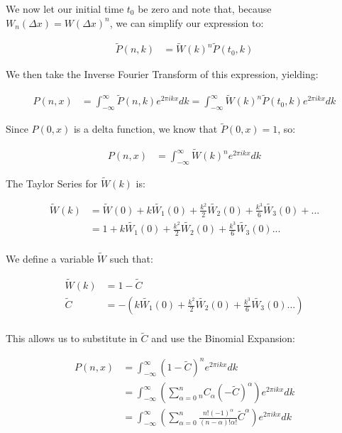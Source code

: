 \documentclass[10pt]{article} %
\begin{document}
We now let our initial time $t_0$ be zero and note that, because
$W_n(\Delta x) = W(\Delta x)^n$, we can simplify our expression to:

\begin{align}
  \widetilde{P}(n,k) &= \widetilde{W}(k)^n\widetilde{P}(t_0,k)
\end{align}

We then take the Inverse Fourier Transform of this expression, yielding:

\begin{align}
  P(n,x) &= \int_{-\infty}^{\infty}\widetilde{P}(n,k)e^{2\pi ikx}dk
  = \int_{-\infty}^{\infty}\widetilde{W}(k)^n\widetilde{P}(t_0,k)e^{2\pi ikx}dk
\end{align}

Since $P(0,x)$ is a delta function, we know that $\widetilde{P}(0,x) = 1$, so:

\begin{align}
  P(n,x) &=  \int_{-\infty}^{\infty}\widetilde{W}(k)^ne^{2\pi ikx}dk
\end{align}

The Taylor Series for $\widetilde{W}(k)$ is:

\begin{align*}
  \widetilde{W}(k) &= \widetilde{W}(0) + k\widetilde{W_1}(0) + \frac{k^2}{2}\widetilde{W_2}(0) + \frac{k^3}{6}\widetilde{W_3}(0) + ...\\
  &= 1 + k\widetilde{W_1}(0) + \frac{k^2}{2}\widetilde{W_2}(0) + \frac{k^3}{6}\widetilde{W_3}(0) ...\\
\end{align*}

We define a variable $\widetilde{W}$ such that:

\begin{align*}
  \widetilde{W}(k) &= 1 - \widetilde{C}\\
  \widetilde{C} &= -(k\widetilde{W_1}(0) + \frac{k^2}{2}\widetilde{W_2}(0) + \frac{k^3}{6}\widetilde{W_3}(0) ...)\\
\end{align*}

This allows us to substitute in $\widetilde{C}$ and use the Binomial Expansion:

\begin{align}
  P(n,x) &=  \int_{-\infty}^{\infty}\left(1 - \widetilde{C}\right)^ne^{2\pi ikx}dk\\
  &= \int_{-\infty}^{\infty}\left(\sum_{\alpha=0}^n {}_nC_\alpha\left(-\widetilde{C}\right)^\alpha\right)e^{2\pi ikx}dk\\
  &= \int_{-\infty}^{\infty}\left(\sum_{\alpha=0}^n \frac{n!(-1)^\alpha}{(n-\alpha)!\alpha!} \widetilde{C}^\alpha\right)e^{2\pi ikx}dk
\end{align}
\end{document}
